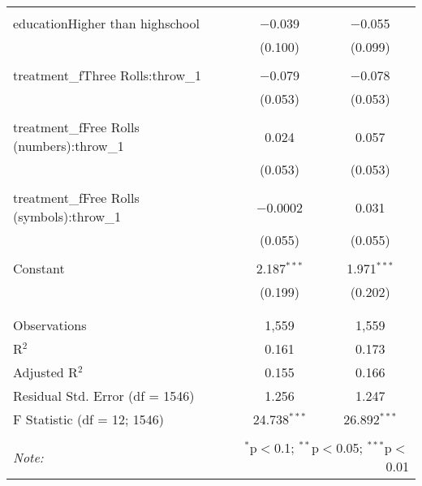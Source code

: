 \begin{table}[!htbp]
\begin{tabular}{@{\extracolsep{5pt}}lcc}
  & & \\ 
 educationHigher than highschool & $-$0.039 & $-$0.055 \\ 
  & (0.100) & (0.099) \\ 
  & & \\ 
 treatment\_fThree Rolls:throw\_1 & $-$0.079 & $-$0.078 \\ 
  & (0.053) & (0.053) \\ 
  & & \\ 
 treatment\_fFree Rolls (numbers):throw\_1 & 0.024 & 0.057 \\ 
  & (0.053) & (0.053) \\ 
  & & \\ 
 treatment\_fFree Rolls (symbols):throw\_1 & $-$0.0002 & 0.031 \\ 
  & (0.055) & (0.055) \\ 
  & & \\ 
 Constant & 2.187$^{***}$ & 1.971$^{***}$ \\ 
  & (0.199) & (0.202) \\ 
  & & \\ 
\hline \\[-1.8ex] 
Observations & 1,559 & 1,559 \\ 
R$^{2}$ & 0.161 & 0.173 \\ 
Adjusted R$^{2}$ & 0.155 & 0.166 \\ 
Residual Std. Error (df = 1546) & 1.256 & 1.247 \\ 
F Statistic (df = 12; 1546) & 24.738$^{***}$ & 26.892$^{***}$ \\ 
\hline 
\hline \\[-1.8ex] 
\textit{Note:}  & \multicolumn{2}{r}{$^{*}$p$<$0.1; $^{**}$p$<$0.05; $^{***}$p$<$0.01} \\ 
\end{tabular} 
\end{table} 

